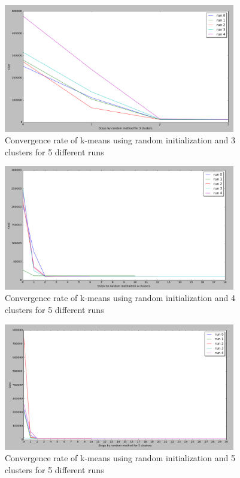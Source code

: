 \begin{figure}[!htb]
\centering
\includegraphics[width=0.9\textwidth]{shots/random3clusters.png}
\caption{ Convergence rate of k-means using random initialization and 3 clusters for 5 different runs }
\label{random3clusters}
\end{figure}



\begin{figure}[!htb]
\centering
\includegraphics[width=0.9\textwidth]{shots/random4clusters.png}
\caption{ Convergence rate of k-means using random initialization and 4 clusters for 5 different runs }
\label{random4clusters}
\end{figure}



\begin{figure}[!htb]
\centering
\includegraphics[width=0.9\textwidth]{shots/random5clusters.png}
\caption{ Convergence rate of k-means using random initialization and 5 clusters for 5 different runs  }
\label{random5clusters}
\end{figure}


